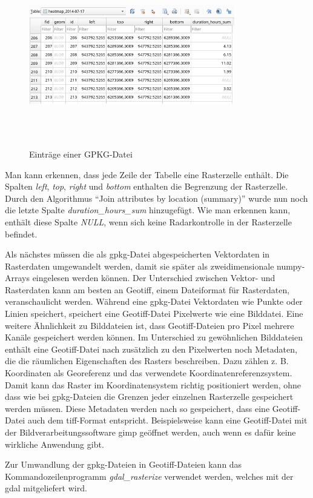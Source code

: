 \begin{figure}[h]
    \centering
    \includegraphics[width=0.8\textwidth,height=8cm,keepaspectratio=true]{content/images/GpkgExample.png}
    \caption{Einträge einer GPKG-Datei}
    \label{fig:GpkgExample}
\end{figure}

Man kann erkennen, dass jede Zeile der Tabelle eine Rasterzelle enthält.
Die Spalten \emph{left}, \emph{top}, \emph{right} und \emph{bottom} enthalten die Begrenzung der Rasterzelle.
Durch den Algorithmus "`Join attributes by location (summary)"' wurde nun noch die letzte Spalte \emph{duration\_hours\_sum} hinzugefügt.
Wie man erkennen kann, enthält diese Spalte \emph{NULL}, wenn sich keine Radarkontrolle in der Rasterzelle befindet.

Als nächstes müssen die als \acrshort{gpkg}-Datei abgespeicherten Vektordaten in Rasterdaten umgewandelt werden, damit sie später als zweidimensionale numpy-Arrays eingelesen werden können.
Der Unterschied zwischen Vektor- und Rasterdaten kann am besten an Geotiff, einem Dateiformat für Rasterdaten, veranschaulicht werden.
Während eine \acrshort{gpkg}-Datei Vektordaten wie Punkte oder Linien speichert, speichert eine Geotiff-Datei Pixelwerte wie eine Bilddatei.
Eine weitere Ähnlichkeit zu Bilddateien ist, dass Geotiff-Dateien pro Pixel mehrere Kanäle gespeichert werden können.
Im Unterschied zu gewöhnlichen Bilddateien enthält eine Geotiff-Datei nach \cite[S. 128]{PracticalGIS} zusätzlich zu den Pixelwerten noch Metadaten, die die räumlichen Eigenschaften des Rasters beschreiben.
Dazu zählen z. B. Koordinaten als Georeferenz und das verwendete Koordinatenreferenzsystem.
Damit kann das Raster im Koordinatensystem richtig positioniert werden, ohne dass wie bei \acrshort{gpkg}-Dateien die Grenzen jeder einzelnen Rasterzelle gespeichert werden müssen.
Diese Metadaten werden nach \cite{GeoTIFFStandard} so gespeichert, dass eine Geotiff-Datei auch dem \acrshort{tiff}-Format entspricht.
Beispielsweise kann eine Geotiff-Datei mit der Bildverarbeitungssoftware \acrfull{gimp} geöffnet werden, auch wenn es dafür keine wirkliche Anwendung gibt.

Zur Umwandlung der \acrshort{gpkg}-Dateien in Geotiff-Dateien kann das Kommandozeilenprogramm \emph{gdal\_rasterize} verwendet werden, welches mit der \acrfull{gdal} mitgeliefert wird.

